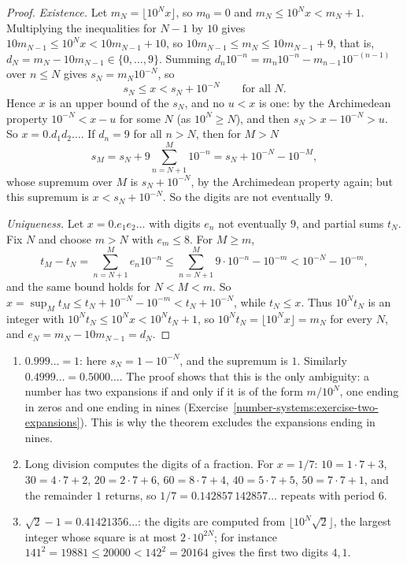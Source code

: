 \begin{proof}
\emph{Existence.} Let $m_N = \lfloor 10^Nx\rfloor$, so $m_0 = 0$ and $m_N \leq 10^Nx < m_N + 1$. Multiplying the inequalities for $N - 1$ by $10$ gives $10m_{N-1} \leq 10^Nx < 10m_{N-1} + 10$, so
$10m_{N-1} \leq m_N \leq 10m_{N-1} + 9$, that is, $d_N = m_N - 10m_{N-1} \in \{0, \ldots, 9\}$. Summing $d_n10^{-n} = m_n10^{-n} - m_{n-1}10^{-(n-1)}$ over $n \leq N$ gives $s_N = m_N10^{-N}$, so
\[
s_N \leq x < s_N + 10^{-N} \qquad\text{for all } N.
\]
Hence $x$ is an upper bound of the $s_N$, and no $u < x$ is one: by the Archimedean property $10^{-N} < x - u$ for some $N$ (as $10^N \geq N$), and then $s_N > x - 10^{-N} > u$. So $x = 0.d_1d_2\ldots$. If $d_n = 9$
for all $n > N$, then for $M > N$
\[
s_M = s_N + 9\sum_{n=N+1}^M10^{-n} = s_N + 10^{-N} - 10^{-M},
\]
whose supremum over $M$ is $s_N + 10^{-N}$, by the Archimedean property again; but this supremum is $x < s_N + 10^{-N}$. So the digits are not eventually $9$.

\emph{Uniqueness.} Let $x = 0.e_1e_2\ldots$ with digits $e_n$ not eventually $9$, and partial sums $t_N$. Fix $N$ and choose $m > N$ with $e_m \leq 8$. For $M \geq m$,
\[
t_M - t_N = \sum_{n=N+1}^Me_n10^{-n} \leq \sum_{n=N+1}^M9 \cdot 10^{-n} - 10^{-m} < 10^{-N} - 10^{-m},
\]
and the same bound holds for $N < M < m$. So $x = \sup_Mt_M \leq t_N + 10^{-N} - 10^{-m} < t_N + 10^{-N}$, while $t_N \leq x$. Thus $10^Nt_N$ is an integer with $10^Nt_N \leq 10^Nx < 10^Nt_N + 1$, so
$10^Nt_N = \lfloor 10^Nx\rfloor = m_N$ for every $N$, and $e_N = m_N - 10m_{N-1} = d_N$.
\end{proof}

\begin{example}\label{number-systems:example-decimals}
\begin{enumerate}
\item $0.999\ldots = 1$: here $s_N = 1 - 10^{-N}$, and the supremum is $1$. Similarly $0.4999\ldots = 0.5000\ldots$. The proof shows that this is the only ambiguity: a number has two expansions if and only if it is
of the form $m/10^N$, one ending in zeros and one ending in nines (Exercise~\ref{number-systems:exercise-two-expansions}). This is why the theorem excludes the expansions ending in nines.
\item Long division computes the digits of a fraction. For $x = 1/7$: $10 = 1 \cdot 7 + 3$, $30 = 4 \cdot 7 + 2$, $20 = 2 \cdot 7 + 6$, $60 = 8 \cdot 7 + 4$, $40 = 5 \cdot 7 + 5$, $50 = 7 \cdot 7 + 1$, and the remainder $1$
returns, so $1/7 = 0.142857\,142857\ldots$ repeats with period $6$.
\item $\sqrt 2 - 1 = 0.41421356\ldots$: the digits are computed from $\lfloor 10^N\sqrt 2\rfloor$, the largest integer whose square is at most $2 \cdot 10^{2N}$; for instance $141^2 = 19881 \leq 20000 < 142^2 = 20164$
gives the first two digits $4, 1$.
\end{enumerate}
\end{example}

